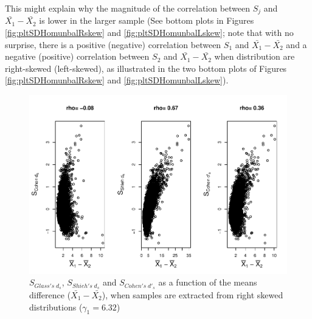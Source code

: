 \documentclass[
  man]{apa6}
\begin{document}
This might explain why the magnitude of the correlation between \(S_j\) and \(\bar{X_1}-\bar{X_2}\) is lower in the larger sample (See bottom plots in Figures \ref{fig:pltSDHomunbalRskew} and \ref{fig:pltSDHomunbalLskew}; note that with no surprise, there is a positive (negative) correlation between \(S_1\) and \(\bar{X_1}-\bar{X_2}\) and a negative (positive) correlation between \(S_2\) and \(\bar{X_1}-\bar{X_2}\) when distribution are right-skewed (left-skewed), as illustrated in the two bottom plots of Figures \ref{fig:pltSDHomunbalRskew} and \ref{fig:pltSDHomunbalLskew}).

\begin{figure}
\centering
\includegraphics{Correlations-between-the-sample-means-difference-and-standardizers-of-all-estimators,-and-implications-on-biases-and-variances-of-all-estimators_files/figure-latex/pltStdzrHomunbalRskew-1.pdf}
\caption{\label{fig:pltStdzrHomunbalRskew}\(S_{Glass's \; d_s}\), \(S_{Shieh's \; d_s}\) and \(S_{Cohen's \; d'_s}\) as a function of the means difference (\(\bar{X_1}-\bar{X_2}\)), when samples are extracted from right skewed distributions (\(\gamma_1 = 6.32\))}
\end{figure}
\end{document}
